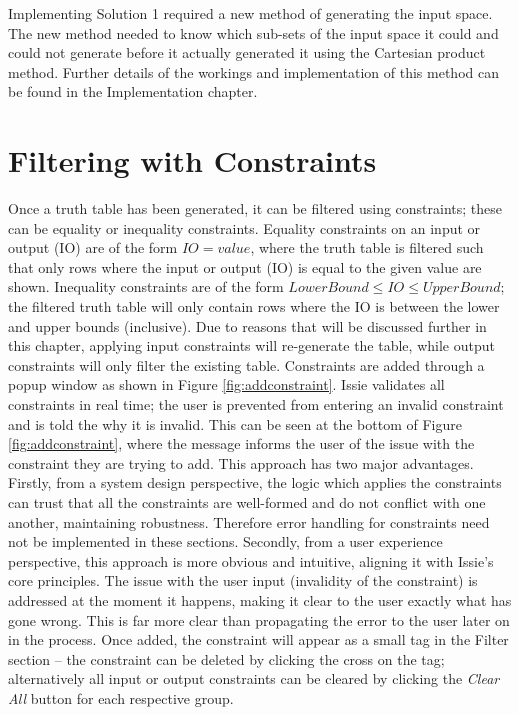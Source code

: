 Implementing Solution 1 required a new method of generating the input space. The new method needed to know which sub-sets of the input space it could and could not generate before it actually generated it using the Cartesian product method. Further details of the workings and implementation of this method can be found in the Implementation chapter.

\section{Filtering with Constraints}
Once a truth table has been generated, it can be filtered using constraints; these can be equality or inequality constraints. Equality constraints on an input or output (IO) are of the form $IO = value$, where the truth table is filtered such that only rows where the input or output (IO) is equal to the given value are shown. Inequality constraints are of the form $LowerBound \leq IO \leq UpperBound$; the filtered truth table will only contain rows where the IO is between the lower and upper bounds (inclusive). Due to reasons that will be discussed further in this chapter, applying input constraints will re-generate the table, while output constraints will only filter the existing table. 
Constraints are added through a popup window as shown in Figure \ref{fig:addconstraint}. Issie validates all constraints in real time; the user is prevented from entering an invalid constraint and is told the why it is invalid. This can be seen at the bottom of Figure \ref{fig:addconstraint}, where the message informs the user of the issue with the constraint they are trying to add. This approach has two major advantages. Firstly, from a system design perspective, the logic which applies the constraints can trust that all the constraints are well-formed and do not conflict with one another, maintaining robustness. Therefore error handling for constraints need not be implemented in these sections. Secondly, from a user experience perspective, this approach is more obvious and intuitive, aligning it with Issie's core principles. The issue with the user input (invalidity of the constraint) is addressed at the moment it happens, making it clear to the user exactly what has gone wrong. This is far more clear than propagating the error to the user later on in the process.
Once added, the constraint will appear as a small tag in the Filter section -- the constraint can be deleted by clicking the cross on the tag; alternatively all input or output constraints can be cleared by clicking the \textit{Clear All} button for each respective group.
